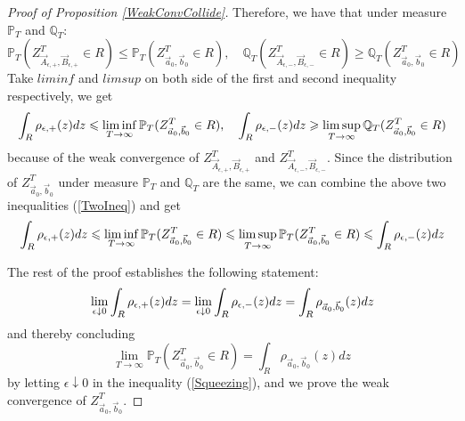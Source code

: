\begin{proof}[Proof of Proposition \ref{WeakConvCollide}]
Therefore, we have that under measure $\mathbb{P}_{T}$ and $\mathbb{Q}_{T}$:
$$\mathbb{P}_{T}(Z^{T}_{\vec{A}_{\epsilon,+},\vec{B}_{\epsilon,+}}\in R)\leqslant \mathbb{P}_{T}(Z^{T}_{\vec{a}_{0},\vec{b}_{0}}\in R),\quad \mathbb{Q}_{T}(Z^{T}_{\vec{A}_{\epsilon,-},\vec{B}_{\epsilon,-}}\in R)\geqslant \mathbb{Q}_{T}(Z^{T}_{\vec{a}_{0},\vec{b}_{0}}\in R)$$
Take $liminf$ and $limsup$ on both side of the first and second inequality respectively, we get
\begin{align}{\label{TwoIneq}}
\int_{R}\rho_{\epsilon,+}(z)dz\leqslant \liminf_{T\rightarrow\infty}\mathbb{P}_{T}(Z^{T}_{\vec{a}_{0},\vec{b}_{0}}\in R),\quad \int_{R}\rho_{\epsilon,-}(z)dz\geqslant \limsup_{T\rightarrow\infty}\mathbb{Q}_{T}(Z^{T}_{\vec{a}_{0},\vec{b}_{0}}\in R)
\end{align}
because of the weak convergence of $Z^{T}_{\vec{A}_{\epsilon,+},\vec{B}_{\epsilon,+}}$ and $Z^{T}_{\vec{A}_{\epsilon,-},\vec{B}_{\epsilon,-}}$. Since the distribution of $Z^{T}_{\vec{a}_{0},\vec{b}_{0}}$ under measure $\mathbb{P}_{T}$ and $\mathbb{Q}_{T}$ are the same, we can combine the above two inequalities (\ref{TwoIneq}) and get
\begin{align}{\label{Squeezing}}
\int_{R}\rho_{\epsilon,+}(z)dz\leqslant \liminf_{T\rightarrow\infty}\mathbb{P}_{T}(Z^{T}_{\vec{a}_{0},\vec{b}_{0}}\in R)\leqslant\limsup_{T\rightarrow\infty}\mathbb{P}_{T}(Z^{T}_{\vec{a}_{0},\vec{b}_{0}}\in R)\leqslant\int_{R}\rho_{\epsilon,-}(z)dz	
\end{align}

The rest of the proof establishes the following statement:
\begin{align}{\label{WeakConvConclude}}
\lim_{\epsilon\downarrow 0}\int_{R}\rho_{\epsilon,+}(z)dz=\lim_{\epsilon\downarrow 0}\int_{R}\rho_{\epsilon,-}(z)dz=\int_{R}\rho_{\vec{a}_{0},\vec{b}_{0}}(z)dz
\end{align}
and thereby concluding $$\lim_{T\rightarrow\infty}\mathbb{P}_{T}(Z^{T}_{\vec{a}_{0},\vec{b}_{0}}\in R)=\int_{R}\rho_{\vec{a}_{0},\vec{b}_{0}}(z)dz$$ by letting $\epsilon\downarrow 0$ in the inequality (\ref{Squeezing}), and we prove the weak convergence of $Z^{T}_{\vec{a}_{0},\vec{b}_{0}}$.


\end{proof}
